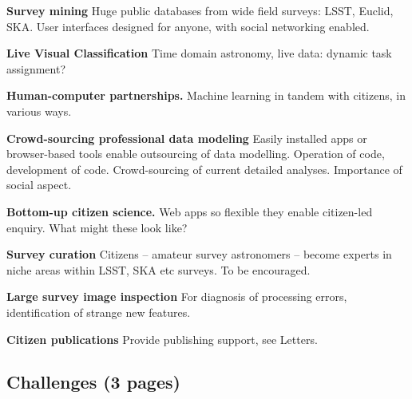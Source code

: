 \documentclass{ar2e}
\begin{document}
\begin{description}

\item{\bf Survey mining}
 Huge public databases from wide field surveys: LSST, Euclid, SKA. User
interfaces designed for anyone, with social networking enabled. 

\item{\bf Live Visual Classification}
Time domain astronomy, live data: dynamic task assignment? 

\item{\bf Human-computer partnerships.} Machine learning in tandem with citizens, in
various ways. 

\item{\bf Crowd-sourcing professional data modeling}
Easily installed apps or browser-based tools enable outsourcing of data
modelling. Operation of code, development of code. Crowd-sourcing of current
detailed analyses. Importance of social aspect. 

\item{\bf Bottom-up citizen science.} Web apps so flexible they enable
citizen-led enquiry. What might these look like?

\item{\bf Survey curation} Citizens -- amateur survey astronomers -- become experts
in niche areas within LSST, SKA etc surveys. To be encouraged.

\item{\bf Large survey image inspection} For diagnosis of processing errors,
identification of strange new features.

\item{\bf Citizen publications} Provide publishing support, see Letters.

\end{description}



\subsection{Challenges (3 pages)}
\label{sec:future:challenges}
\end{document}
